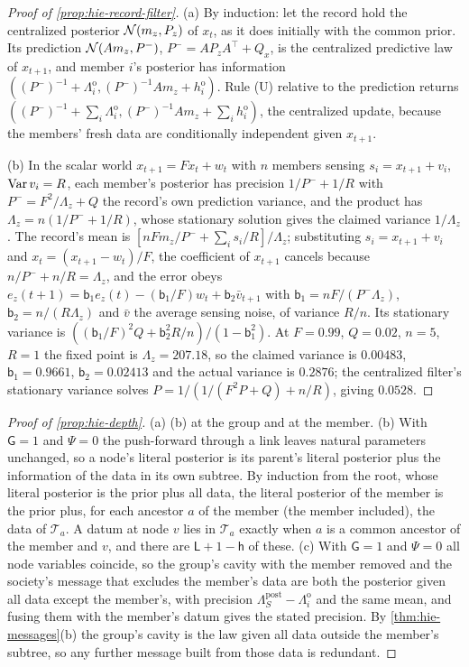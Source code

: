 \begin{proof}[Proof of \cref{prop:hie-record-filter}]
(a) By induction: let the record hold the centralized posterior $\mathcal{N}(m_z,P_z)$ of $x_t$, as it does initially with the common prior. Its prediction $\mathcal{N}(Am_z,P^-)$, $P^-=AP_zA^\top+Q_x$, is the centralized predictive law of $x_{t+1}$, and member $i$'s posterior has information $((P^-)^{-1}+\Lambda^{\mathrm o}_i,(P^-)^{-1}Am_z+h^{\mathrm o}_i)$. Rule (U) relative to the prediction returns $((P^-)^{-1}+\sum_i\Lambda^{\mathrm o}_i,(P^-)^{-1}Am_z+\sum_ih^{\mathrm o}_i)$, the centralized update, because the members' fresh data are conditionally independent given $x_{t+1}$.

(b) In the scalar world $x_{t+1}=Fx_t+w_t$ with $n$ members sensing $s_i=x_{t+1}+v_i$, $\operatorname{Var} v_i=R$, each member's posterior has precision $1/P^-+1/R$ with $P^-=F^2/\Lambda_z+Q$ the record's own prediction variance, and the product has $\Lambda_z=n(1/P^-+1/R)$, whose stationary solution gives the claimed variance $1/\Lambda_z$. The record's mean is $[nFm_z/P^-+\sum_is_i/R]/\Lambda_z$; substituting $s_i=x_{t+1}+v_i$ and $x_t=(x_{t+1}-w_t)/F$, the coefficient of $x_{t+1}$ cancels because $n/P^-+n/R=\Lambda_z$, and the error obeys $e_z(t+1)=\mathsf b_1e_z(t)-(\mathsf b_1/F)w_t+\mathsf b_2\bar v_{t+1}$ with $\mathsf b_1=nF/(P^-\Lambda_z)$, $\mathsf b_2=n/(R\Lambda_z)$ and $\bar v$ the average sensing noise, of variance $R/n$. Its stationary variance is $((\mathsf b_1/F)^2Q+\mathsf b_2^2R/n)/(1-\mathsf b_1^2)$. At $F=0.99$, $Q=0.02$, $n=5$, $R=1$ the fixed point is $\Lambda_z=207.18$, so the claimed variance is $0.00483$, $\mathsf b_1=0.9661$, $\mathsf b_2=0.02413$ and the actual variance is $0.2876$; the centralized filter's stationary variance solves $P=1/(1/(F^2P+Q)+n/R)$, giving $0.0528$.
\end{proof}

\begin{proof}[Proof of \cref{prop:hie-depth}]
(a) (b) at the group and at the member. (b) With $\mathsf G=1$ and $\Psi=0$ the push-forward through a link leaves natural parameters unchanged, so a node's literal posterior is its parent's literal posterior plus the information of the data in its own subtree. By induction from the root, whose literal posterior is the prior plus all data, the literal posterior of the member is the prior plus, for each ancestor $a$ of the member (the member included), the data of $\mathcal T_a$. A datum at node $v$ lies in $\mathcal T_a$ exactly when $a$ is a common ancestor of the member and $v$, and there are $\mathsf L+1-\mathsf h$ of these. (c) With $\mathsf G=1$ and $\Psi=0$ all node variables coincide, so the group's cavity with the member removed and the society's message that excludes the member's data are both the posterior given all data except the member's, with precision $\Lambda^{\mathrm{post}}_S-\Lambda^{\mathrm o}_i$ and the same mean, and fusing them with the member's datum gives the stated precision. By \cref{thm:hie-messages}(b) the group's cavity is the law given all data outside the member's subtree, so any further message built from those data is redundant.
\end{proof}

